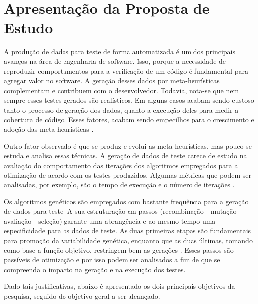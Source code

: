 \chapter[Apresentação da Proposta de Estudo]{Apresentação da Proposta de Estudo}

A produção de dados para teste de forma automatizada é um dos principais avanços na área de engenharia de software. Isso, porque a necessidade de reproduzir comportamentos para a verificação de um código é fundamental para agregar valor no software. A geração desses dados por meta-heurísticas complementam e contribuem com o desenvolvedor. Todavia, nota-se que nem sempre esses testes gerados são realísticos. Em alguns casos acabam sendo custoso tanto o processo de geração dos dados, quanto a execução deles para medir a cobertura de código. Esses fatores, acabam sendo empecilhos para o crescimento e adoção das meta-heurísticas \cite{harman2015achievements}.

Outro fator observado é que se produz e evolui as meta-heurísticas, mas pouco se estuda e analisa essas técnicas. A geração de dados de teste carece de estudo na avaliação do comportamento das iterações dos algoritmos empregados para a otimização de acordo com os testes produzidos. Algumas métricas que podem ser analisadas, por exemplo, são o tempo de execução e o número de iterações \cite{rodrigues2018using}. 

Os algoritmos genéticos são empregados com bastante frequência para a geração de dados para teste. A sua estruturação em passos (recombinação - mutação - avaliação - seleção) garante uma abrangência e ao mesmo tempo uma especificidade para os dados de teste. As duas primeiras etapas são fundamentais para promoção da variabilidade genética, enquanto que as duas últimas, tomando como base a função objetivo, restringem bem as gerações \cite{rodrigues2018using}. Esses passos são passíveis de otimização e por isso podem ser analisados a fim de que se compreenda o impacto na geração e na execução dos testes.

Dado tais justificativas, abaixo é apresentado os dois principais objetivos da pesquisa, seguido do objetivo geral a ser alcançado. 

